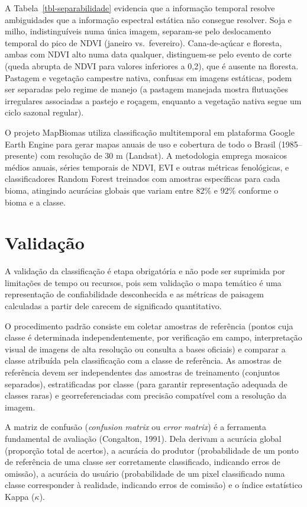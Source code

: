 \documentclass[
  portuguese,
  11pt,
  a4paper,
  open=any]{scrbook}
\begin{document}
A Tabela~\ref{tbl-separabilidade} evidencia que a informação temporal
resolve ambiguidades que a informação espectral estática não consegue
resolver. Soja e milho, indistinguíveis numa única imagem, separam-se
pelo deslocamento temporal do pico de NDVI (janeiro vs.~fevereiro).
Cana-de-açúcar e floresta, ambas com NDVI alto numa data qualquer,
distinguem-se pelo evento de corte (queda abrupta de NDVI para valores
inferiores a 0,2), que é ausente na floresta. Pastagem e vegetação
campestre nativa, confusas em imagens estáticas, podem ser separadas
pelo regime de manejo (a pastagem manejada mostra flutuações irregulares
associadas a pastejo e roçagem, enquanto a vegetação nativa segue um
ciclo sazonal regular).

O projeto MapBiomas utiliza classificação multitemporal em plataforma
Google Earth Engine para gerar mapas anuais de uso e cobertura de todo o
Brasil (1985--presente) com resolução de 30 m (Landsat). A metodologia
emprega mosaicos médios anuais, séries temporais de NDVI, EVI e outras
métricas fenológicas, e classificadores Random Forest treinados com
amostras específicas para cada bioma, atingindo acurácias globais que
variam entre 82\% e 92\% conforme o bioma e a classe.

\section{Validação}\label{validauxe7uxe3o}

A validação da classificação é etapa obrigatória e não pode ser
suprimida por limitações de tempo ou recursos, pois sem validação o mapa
temático é uma representação de confiabilidade desconhecida e as
métricas de paisagem calculadas a partir dele carecem de significado
quantitativo.

O procedimento padrão consiste em coletar amostras de referência (pontos
cuja classe é determinada independentemente, por verificação em campo,
interpretação visual de imagens de alta resolução ou consulta a bases
oficiais) e comparar a classe atribuída pela classificação com a classe
de referência. As amostras de referência devem ser independentes das
amostras de treinamento (conjuntos separados), estratificadas por classe
(para garantir representação adequada de classes raras) e
georreferenciadas com precisão compatível com a resolução da imagem.

A matriz de confusão (\emph{confusion matrix} ou \emph{error matrix}) é
a ferramenta fundamental de avaliação (Congalton, 1991). Dela derivam a
acurácia global (proporção total de acertos), a acurácia do produtor
(probabilidade de um ponto de referência de uma classe ser corretamente
classificado, indicando erros de omissão), a acurácia do usuário
(probabilidade de um pixel classificado numa classe corresponder à
realidade, indicando erros de comissão) e o índice estatístico Kappa
(\(\kappa\)).
\end{document}

